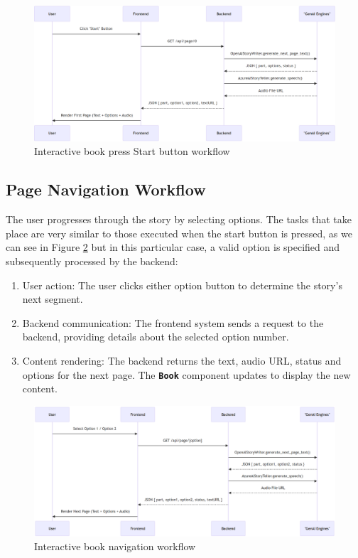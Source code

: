 \documentclass[conference]{IEEEtran}
\begin{document}
	\begin{figure}[H]
		\centering
		\includegraphics[width=0.7\linewidth]{img/img-ARI3333-initiation-workflow}
		\caption{Interactive book press Start button workflow}
		\label{fig:img-ari3333-initiation-workflow}
	\end{figure}
	
	
	\subsection{Page Navigation Workflow}
	
	The user progresses through the story by selecting options. The tasks that take place are very similar to those executed when the start button is pressed, as we can see in Figure \ref{fig:img-ari3333-navigation-workflow} but in this particular case, a valid option is specified and subsequently processed by the backend:

	\begin{enumerate}[]
		\item User action: The user clicks either option button to determine the story's next segment.
		\item Backend communication: The frontend system sends a request to the backend, providing details about the selected option number.
		\item Content rendering: The backend returns the text, audio URL, status and options for the next page. The \textbf{\texttt{Book}} component updates to display the new content.
	\end{enumerate}
	
	\begin{figure}[H]
		\centering
		\includegraphics[width=0.7\linewidth]{img/img-ARI3333-navigation-workflow}
		\caption{Interactive book navigation workflow}
		\label{fig:img-ari3333-navigation-workflow}
	\end{figure}
	
\end{document}
